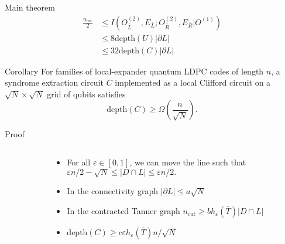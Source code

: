 \begin{frame}[c]{Main theorem}
  \Large
  \begin{align*}
    \frac{n_{\text{cut}}}{2}
    &\leq
    I(O_{\bar L}^{(2)}, E_{\bar L}; O_{\bar R}^{(2)}, E_{\bar R} | O^{(1)}) \\
    &\leq 8 \text{depth}(U) |\partial L| \\
    &\leq 32 \text{depth}(C) |\partial L|
  \end{align*}
\end{frame}

\begin{frame}[c]{Corollary}
  \Large
  For families of local-expander quantum LDPC codes of length $n$,
  a syndrome extraction circuit $C$ implemented as a local Clifford circuit 
  on a $\sqrt{N} \times \sqrt{N}$ grid of qubits
  satisfies
  \begin{equation*}
    \text{depth}(C) 
    \geq
    \Omega \left(
      \frac 
        {n}
        {\sqrt{N}}
    \right).
  \end{equation*}
\end{frame}

\begin{frame}[c]{Proof}
  \centering
  \Large
  \begin{columns}[c]
    \begin{column}{0.4\textwidth}
      \centering
    \end{column}
    \begin{column}{0.6\textwidth}
      \begin{itemize}
        \item
          For all $\varepsilon \in [0, 1]$,
          we can move the line such that  \\
          $
            \varepsilon n/2 - \sqrt{N} \leq |D \cap L| \leq \varepsilon n / 2.
          $
        \pause
        \item
          In the connectivity graph
          $|\partial L| \leq a \sqrt{N}$
        \pause
        \item
          In the contracted Tanner graph
          $n_{\text{cut}} \geq b h_{\varepsilon}(\bar T) |D \cap L| $
        \pause
        \item
          $\text{depth}(C) \geq c \varepsilon h_{\varepsilon}(\bar T)n / \sqrt{N}$
      \end{itemize}
    \end{column}
  \end{columns}
\end{frame}
